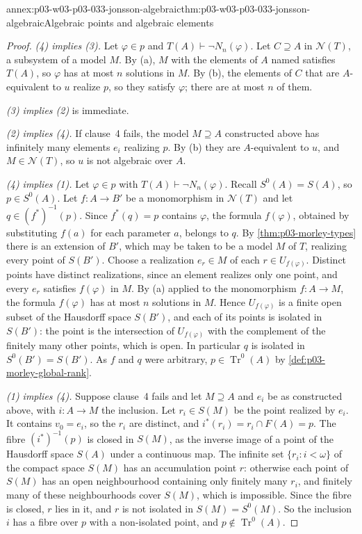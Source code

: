 \begin{annexitem}{annex:p03-w03-p03-033-jonsson-algebraic}{thm:p03-w03-p03-033-jonsson-algebraic}{Algebraic points and algebraic elements}
\begin{proof}
\emph{(4) implies (3).} Let \(\varphi\in p\) and
\(T(A)\vdash\neg N_n(\varphi)\). Let \(C\supseteq A\) in
\(\mathcal N(T)\), a subsystem of a model \(M\). By (a), \(M\) with the
elements of \(A\) named satisfies \(T(A)\), so \(\varphi\) has at most
\(n\) solutions in \(M\). By (b), the elements of \(C\) that are
\(A\)-equivalent to \(u\) realize \(p\), so they satisfy \(\varphi\);
there are at most \(n\) of them.

\emph{(3) implies (2)} is immediate.

\emph{(2) implies (4).} If clause~4 fails, the model \(M\supseteq A\)
constructed above has infinitely many elements \(e_i\) realizing \(p\).
By (b) they are \(A\)-equivalent to \(u\), and \(M\in\mathcal N(T)\), so
\(u\) is not algebraic over \(A\).

\emph{(4) implies (1).} Let \(\varphi\in p\) with
\(T(A)\vdash\neg N_n(\varphi)\). Recall \(S^0(A)=S(A)\), so
\(p\in S^0(A)\). Let \(f:A\to B'\) be a monomorphism in
\(\mathcal N(T)\) and let \(q\in(f^*)^{-1}(p)\). Since
\(f^*(q)=p\) contains \(\varphi\), the formula \(f(\varphi)\), obtained by
substituting \(f(a)\) for each parameter \(a\), belongs to \(q\). By
\cref{thm:p03-morley-types} there is an extension of \(B'\), which may be
taken to be a model \(M\) of \(T\), realizing every point of \(S(B')\).
Choose a realization \(e_r\in M\) of each \(r\in U_{f(\varphi)}\). Distinct
points have distinct realizations, since an element realizes only one
point, and every \(e_r\) satisfies \(f(\varphi)\) in \(M\). By (a) applied
to the monomorphism \(f:A\to M\), the formula \(f(\varphi)\) has at most
\(n\) solutions in \(M\). Hence \(U_{f(\varphi)}\) is a finite open subset
of the Hausdorff space \(S(B')\), and each of its points is isolated in
\(S(B')\): the point is the intersection of \(U_{f(\varphi)}\) with the
complement of the finitely many other points, which is open. In
particular \(q\) is isolated in \(S^0(B')=S(B')\). As \(f\) and \(q\) were
arbitrary, \(p\in\operatorname{Tr}^0(A)\) by
\cref{def:p03-morley-global-rank}.

\emph{(1) implies (4).} Suppose clause~4 fails and let \(M\supseteq A\)
and \(e_i\) be as constructed above, with \(i:A\to M\) the inclusion. Let
\(r_i\in S(M)\) be the point realized by \(e_i\). It contains
\(v_0=e_i\), so the \(r_i\) are distinct, and
\(i^*(r_i)=r_i\cap F(A)=p\). The fibre \((i^*)^{-1}(p)\) is closed in
\(S(M)\), as the inverse image of a point of the Hausdorff space \(S(A)\)
under a continuous map. The infinite set \(\{r_i:i<\omega\}\) of the
compact space \(S(M)\) has an accumulation point \(r\): otherwise each
point of \(S(M)\) has an open neighbourhood containing only finitely many
\(r_i\), and finitely many of these neighbourhoods cover \(S(M)\), which
is impossible. Since the fibre is closed, \(r\) lies in it, and \(r\) is
not isolated in \(S(M)=S^0(M)\). So the inclusion \(i\) has a fibre over
\(p\) with a non-isolated point, and \(p\notin\operatorname{Tr}^0(A)\).


\end{proof}
\end{annexitem}
